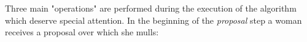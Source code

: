 {\begin{code}
\AgdaSpace{}%
\AgdaSpace{}%
\AgdaSymbol{)}\AgdaSpace{}%
\AgdaSpace{}%
\AgdaSpace{}%
\<%
\\
\>[0]\AgdaSpace{}%
\AgdaSpace{}%
\AgdaInductiveConstructor{[]}\AgdaSpace{}%
\AgdaSymbol{=}\AgdaSpace{}%
\AgdaInductiveConstructor{[]}\AgdaSpace{}%
\<%
\\
\>[0]\AgdaSpace{}%
\AgdaSpace{}%
\AgdaSymbol{((}\AgdaSpace{}%
\AgdaOperator{\AgdaInductiveConstructor{,}}\AgdaSpace{}%
\AgdaSymbol{)}\AgdaSpace{}%
\AgdaSpace{}%
\AgdaSymbol{)}\AgdaSpace{}%
\AgdaSpace{}%
\AgdaSpace{}%
\AgdaSpace{}%
\<%
\\
\>[0]\AgdaSpace{}%
\AgdaSymbol{|}\AgdaSpace{}%
\AgdaSpace{}%
\AgdaSymbol{\AgdaUnderscore{}}\AgdaSpace{}%
\AgdaSymbol{=}\AgdaSpace{}%
\<%
\\
\>[0]\AgdaSpace{}%
\AgdaSymbol{|}\AgdaSpace{}%
\AgdaSymbol{\AgdaUnderscore{}}%
\>[14]\AgdaSymbol{=}\AgdaSpace{}%
\AgdaSpace{}%
\AgdaSpace{}%
\<%
\\
\>[0]\<%
\end{code}

Three main "operations" are performed during the execution of the algorithm which deserve special attention. In the beginning of the \emph{proposal} step a woman receives a proposal over which she mulls:

}
